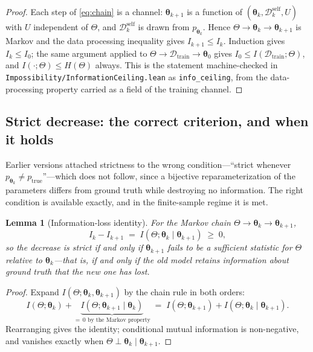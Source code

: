 \documentclass[11pt,a4paper]{article}
\newtheorem{lemma}[theorem]{Lemma}
\begin{document}
\begin{proof}
Each step of \eqref{eq:chain} is a channel: $\bm{\theta}_{k+1}$ is a function of $(\bm{\theta}_k, \mathcal{D}_k^{\mathrm{self}}, U)$ with $U$ independent of $\Theta$, and $\mathcal{D}_k^{\mathrm{self}}$ is drawn from $p_{\bm{\theta}_k}$. Hence $\Theta \to \bm{\theta}_k \to \bm{\theta}_{k+1}$ is Markov and the data processing inequality gives $I_{k+1} \leq I_k$. Induction gives $I_k \leq I_0$; the same argument applied to $\Theta \to \mathcal{D}_{\mathrm{train}} \to \bm{\theta}_0$ gives $I_0 \leq I(\mathcal{D}_{\mathrm{train}}; \Theta)$, and $I(\cdot;\Theta) \leq H(\Theta)$ always. This is the statement machine-checked in \texttt{Impossibility/InformationCeiling.lean} as \texttt{info\_ceiling}, from the data-processing property carried as a field of the training channel.
\end{proof}

\subsection{Strict decrease: the correct criterion, and when it holds}
\label{sec:strictness}

Earlier versions attached strictness to the wrong condition---``strict whenever $p_{\bm{\theta}_k} \neq p_{\mathrm{true}}$''---which does not follow, since a bijective reparameterization of the parameters differs from ground truth while destroying no information. The right condition is available exactly, and in the finite-sample regime it is met.

\begin{lemma}[Information-loss identity]
\label{lem:strict_criterion}
For the Markov chain $\Theta \to \bm{\theta}_k \to \bm{\theta}_{k+1}$,
\begin{equation}
I_k - I_{k+1} \;=\; I(\Theta; \bm{\theta}_k \mid \bm{\theta}_{k+1}) \;\geq\; 0 ,
\end{equation}
so the decrease is strict if and only if $\bm{\theta}_{k+1}$ fails to be a sufficient statistic for $\Theta$ relative to $\bm{\theta}_k$---that is, if and only if the old model retains information about ground truth that the new one has lost.
\end{lemma}

\begin{proof}
Expand $I(\Theta; \bm{\theta}_k, \bm{\theta}_{k+1})$ by the chain rule in both orders:
\begin{equation}
I(\Theta; \bm{\theta}_k) + \underbrace{I(\Theta; \bm{\theta}_{k+1} \mid \bm{\theta}_k)}_{=\,0 \text{ by the Markov property}}
\;=\; I(\Theta; \bm{\theta}_{k+1}) + I(\Theta; \bm{\theta}_k \mid \bm{\theta}_{k+1}) .
\end{equation}
Rearranging gives the identity; conditional mutual information is non-negative, and vanishes exactly when $\Theta \perp \bm{\theta}_k \mid \bm{\theta}_{k+1}$.
\end{proof}
\end{document}
